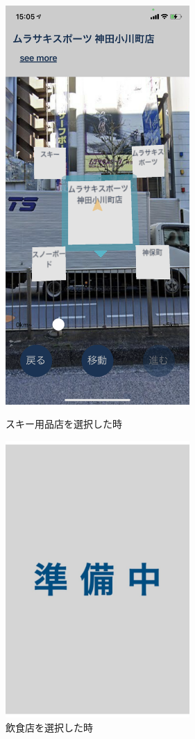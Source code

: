 \begin{figure}[h]
  \begin{minipage}{0.5\hsize}
    \centering
    \includegraphics[width=70mm]{images/ar_navigation_jibotyo_ski.png}
    \caption{スキー用品店を選択した時} \label{fig:ar_navigation_jibotyo_ski}
  \end{minipage}
  \begin{minipage}{0.5\hsize}
    \centering
    \includegraphics[width=70mm]{images/wip2.jpg}
    \caption{飲食店を選択した時} \label{fig:ar_navigation_jibotyo_lunch}
  \end{minipage}
\end{figure}



